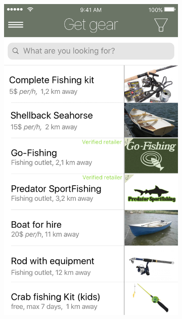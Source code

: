 \begin{figure}[H]
\begin{subfigure}[t]{0.23\textwidth}
  	  \includegraphics[width=\textwidth]{images/Get_gear.png}
  \end{subfigure}  
  \hfill
  \begin{subfigure}[t]{0.23\textwidth}
  	  \centering

\end{subfigure}
\end{figure}
